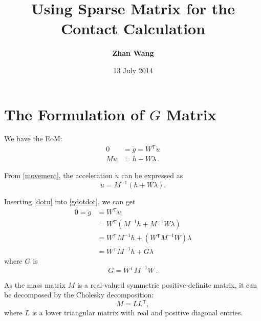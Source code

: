 \documentclass[a4paper,fleqn,13pt]{article}
\newcommand\transpose{{}^\mathsf{T}}
\begin{document}
\title{ Using Sparse Matrix for the Contact Calculation}
\author{\bf Zhan Wang}
\date{ 13 July 2014}
\maketitle
\pagestyle{fancy}
\rhead{}
\lhead{}
\oddsidemargin 0in
\evensidemargin 0in
\tableofcontents

\newpage
\flushleft

\section{The Formulation of $G$ Matrix}

We have the EoM:
\begin{align}
 0 &= \ddot{g}={W}\transpose \dot{u} \label{gdotdot} \\
 M \dot{u} &= h + W \lambda \ . \label{movement} 
\end{align}

From \ref{movement}, the acceleration $\dot{u}$ can be expressed as
\begin{equation}
 \dot{u} = M^{-1}(h + W \lambda) \label{dotu} .
\end{equation}

Inserting \ref{dotu} into \ref{gdotdot}, we can get
\begin{equation}
 \begin{aligned}
  0 = \ddot{g} &={W}\transpose \dot{u} \\
                &={W}\transpose(M^{-1}h + M^{-1}W \lambda) \\
                &={W}\transpose M^{-1}h + ({W}\transpose M^{-1} W )\lambda \\
                &={W}\transpose M^{-1}h + G \lambda
 \end{aligned}
\end{equation}
where $G$ is 
\begin{equation}
 G = {W}\transpose M^{-1} W  \ . \label{G_original}
\end{equation}

As the mass matrix $M$ is a real-valued symmetric positive-definite matrix, it can be decomposed by the Cholesky decomposition:
\begin{equation}
 M = L {L}\transpose , \label{M_decomposation} 
\end{equation}
where $L$ is a lower triangular matrix with real and positive diagonal entries.
\end{document}
